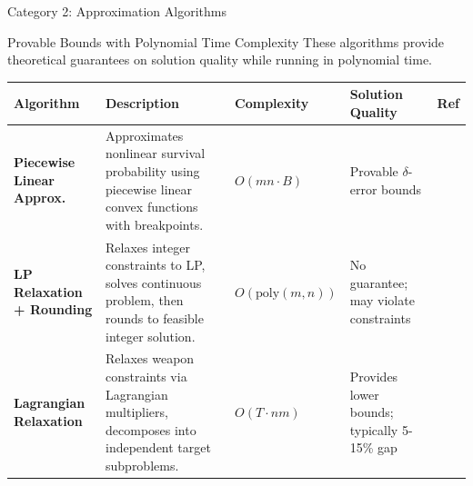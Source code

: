 \documentclass[aspectratio=43,8pt]{beamer}
\begin{document}
\begin{frame}{Category 2: Approximation Algorithms}
\begin{block}{Provable Bounds with Polynomial Time Complexity}
These algorithms provide theoretical guarantees on solution quality while running in polynomial time.
\end{block}

\vspace{0.2cm}
\begin{table}[h]
\centering
\small
\begin{tabular}{p{1.8cm}p{3.6cm}p{1.6cm}p{1.7cm}p{0.8cm}}
\toprule
\textbf{Algorithm} & \textbf{Description} & \textbf{Complexity} & \textbf{Solution Quality} & \textbf{Ref} \\
\midrule
\textbf{Piecewise Linear Approx.} & Approximates nonlinear survival probability using piecewise linear convex functions with breakpoints. & $O(mn \cdot B)$ & Provable $\delta$-error bounds & \cite{andersen2022} \\
\addlinespace
\textbf{LP Relaxation + Rounding} & Relaxes integer constraints to LP, solves continuous problem, then rounds to feasible integer solution. & $O(\text{poly}(m,n))$ & No guarantee; may violate constraints & \cite{ahuja2007} \\
\addlinespace
\textbf{Lagrangian Relaxation} & Relaxes weapon constraints via Lagrangian multipliers, decomposes into independent target subproblems. & $O(T \cdot nm)$ & Provides lower bounds; typically 5-15\% gap & \cite{kwon1999} \\
\bottomrule
\end{tabular}
\end{table}
\end{frame}
\end{document}
